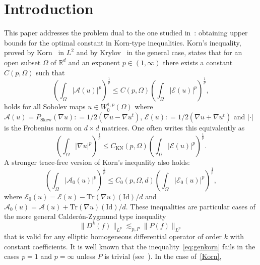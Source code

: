 \documentclass[11pt, a4paper]{amsart}
\theoremstyle{definition}
\theoremstyle{remark}
\begin{document}
\section{Introduction}
This paper addresses the problem dual to the one 
studied in~\cite{Cassese2025}:
obtaining upper bounds for the optimal constant
in Korn-type inequalities.
Korn's inequality, proved by
Korn~\cite{korn1908, korn1909} in $L^2$ and by 
Krylov~\cite{Krylov1962Dirichlet}
in the general case, states that
for an open subset $\Omega$ of
$\mathbb R^d$ and an exponent $p\in(1,\infty)$
there exists a constant $C(p,\Omega)$ such that
\begin{equation}\label{Korn}
    \left(
        \int_{\Omega} |\mathcal A(u)|^p
    \right)^{\frac 1p}
    \le
    C(p,\Omega)
    \left(
        \int_{\Omega}|\mathcal E(u)|^p
    \right)^{\frac 1p},
\end{equation}
holds for all Sobolev maps $u\in W^{1,p}_0(\Omega)$
where 
$\mathcal A(u)=P_{\mathrm{Skew}}(\nabla u)
\mathrel{:}=
1/2(\nabla u-\nabla u^t)$,
$\mathcal E(u)
\mathrel{:}=
1/2(\nabla u+\nabla u^t)$
and $|\cdot|$ is the Frobenius norm
on $d\times d$ matrices.
One often writes this equivalently as
\begin{equation}\label{eq:Kornfull}
    \left(
        \int_{\Omega}|\nabla u|^p
    \right)^{\frac1p}
    \le
    C_{\mathrm{KN}}(p,\Omega)
    \left(
        \int_{\Omega}|\mathcal E(u)|^p
    \right)^{\frac1p}.
\end{equation}
A stronger trace-free version of Korn's inequality 
also holds:
\begin{equation}\label{Korntrace}
    \left(
        \int_{\Omega} |\mathcal A_0(u)|^p
    \right)^{\frac 1p}
    \le
    C_0(p,\Omega,d)
    \left(
        \int_{\Omega}|\mathcal E_0(u)|^p
    \right)^{\frac 1p},
\end{equation}
where 
$\mathcal E_0(u)
=
\mathcal E(u)-
\mathrm{Tr}(\nabla u)(\mathrm{Id})/d$
and
$\mathcal A_0(u)
=
\mathcal A(u)+
\mathrm{Tr}(\nabla u)(\mathrm{Id})/d$.
These inequalities are particular cases
of the more general Calderón-Zygmund type inequality
\begin{equation}
    \|D^k(f)\|_{L^p}\lesssim_{p,P} \|P(f)\|_{L^p}
    \label{eq:genkorn}
\end{equation}
that is valid for any elliptic homogeneous 
differential operator of order $k$ with constant 
coefficients.
It is well known that the 
inequality~\eqref{eq:genkorn} fails
in the cases $p=1$ and $p=\infty$ unless $P$
is trivial
(see~\cite{Ornstein, deLeeuw, KirchheimJan}).
In the case of~\eqref{Korn},
\end{document}
